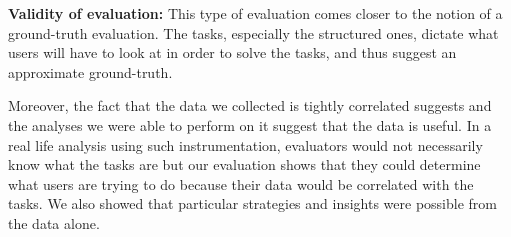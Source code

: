 \textbf{Validity of evaluation:} This type of evaluation comes closer to the notion of a ground-truth evaluation. The tasks, especially the structured ones, dictate what users will have to look at in order to solve the tasks, and thus suggest an approximate ground-truth. 

Moreover, the fact that the data we collected is tightly correlated suggests and the analyses we were able to perform on it suggest that the data is useful. In a real life analysis using such instrumentation, evaluators would not necessarily know what the tasks are but our evaluation shows that they could determine what users are trying to do because their data would be correlated with the tasks. We also showed that particular strategies and insights were possible from the data alone. 
